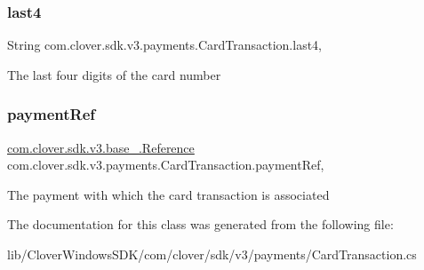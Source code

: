 \subsubsection{\texorpdfstring{last4}{last4}}
{\footnotesize\ttfamily String com.\+clover.\+sdk.\+v3.\+payments.\+Card\+Transaction.\+last4\hspace{0.3cm}{\ttfamily [get]}, {\ttfamily [set]}}



The last four digits of the card number 

\mbox{\label{classcom_1_1clover_1_1sdk_1_1v3_1_1payments_1_1_card_transaction_ab2e18403d61ac56a7225a75a358cb8a1}} 
\subsubsection{\texorpdfstring{payment\+Ref}{paymentRef}}
{\footnotesize\ttfamily \hyperlink{classcom_1_1clover_1_1sdk_1_1v3_1_1base___1_1_reference}{com.\+clover.\+sdk.\+v3.\+base\+\_\+.\+Reference} com.\+clover.\+sdk.\+v3.\+payments.\+Card\+Transaction.\+payment\+Ref\hspace{0.3cm}{\ttfamily [get]}, {\ttfamily [set]}}



The payment with which the card transaction is associated 



The documentation for this class was generated from the following file\+:\begin{DoxyCompactItemize}
\item 
lib/\+Clover\+Windows\+S\+D\+K/com/clover/sdk/v3/payments/Card\+Transaction.\+cs\end{DoxyCompactItemize}
